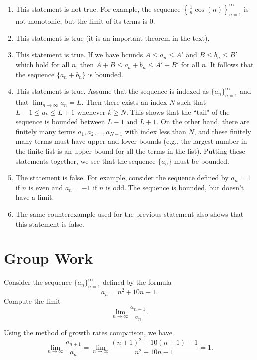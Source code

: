\documentclass[]{ximera}
\begin{document}
\begin{freeResponse}
\begin{enumerate}[label=(\alph*)]
\item This statement is not true. For example, the sequence $\left\{\frac{1}{n} \cos (n) \right\}_{n=1}^\infty$ is not monotonic, but the limit of its terms is $0$. 
\item This statement is true (it is an important theorem in the text).
\item This statement is true. If we have bounds $A \leq a_n \leq A'$ and $B \leq b_n \leq B'$ which hold for all $n$, then $A + B \leq a_n + b_n \leq A' + B'$ for all $n$. It follows that the sequence $\{a_n+b_n\}$ is bounded.
\item This statement is true. Assume that the sequence is indexed as $\{a_n\}_{n=1}^\infty$ and that $\lim_{n \rightarrow \infty} a_n = L$. Then there exists an index $N$ such that $L-1 \leq a_k \leq L+1$ whenever $k \geq N$. This shows that the ``tail" of the sequence is bounded between $L-1$ and $L+1$. On the other hand, there are finitely many terms $a_1,a_2,\ldots,a_{N-1}$ with index less than $N$, and these finitely many terms must have upper and lower bounds (e.g., the largest number in the finite list is an upper bound for all the terms in the list). Putting these statements together, we see that the sequence $\{a_n\}$ must be bounded.
\item The statement is false. For example, consider the sequence defined by $a_n = 1$ if $n$ is even and $a_n = -1$ if $n$ is odd. The sequence is bounded, but doesn't have a limit. 
\item The same counterexample used for the previous statement also shows that this statement is false.
\end{enumerate}
\end{freeResponse}
\section{Group Work}

\begin{problem}
Consider the sequence $\{a_n\}_{n=1}^\infty$ defined by the formula
$$
a_n = n^2 + 10n -1.
$$
Compute the limit
$$
\lim_{n \rightarrow \infty} \frac{a_{n+1}}{a_n}.
$$
\end{problem}

\begin{freeResponse}
Using the method of growth rates comparison, we have
$$
\lim_{n \rightarrow \infty} \frac{a_{n+1}}{a_n} = \lim_{n \rightarrow \infty}  \frac{(n+1)^2 + 10(n+1) - 1}{n^2 + 10n -1} = 1.
$$
\end{freeResponse}
\end{document}
